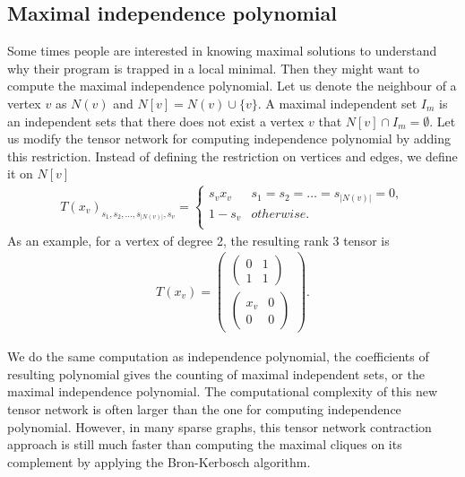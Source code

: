 \documentclass[review,onefignum,onetabnum]{siamart190516}
\newcommand{\<}{\langle}
\renewcommand{\>}{\rangle}
\newcounter{example}
\begin{document}
\subsection{Maximal independence polynomial}
Some times people are interested in knowing maximal solutions to understand why their program is trapped in a local minimal.
Then they might want to compute the maximal independence polynomial.
Let us denote the neighbour of a vertex $v$ as $N(v)$ and $N[v] = N(v)\cup \{v\}$.
A maximal independent set $I_m$ is an independent sets that there does not exist a vertex $v$ that $N[v] \cap I_m = \emptyset$.
Let us modify the tensor network for computing independence polynomial by adding this restriction.
Instead of defining the restriction on vertices and edges, we define it on $N[v]$
\begin{align}
    T(x_v)_{s_1,s_2,\ldots,s_{|N(v)|},s_v} = \begin{cases}
        s_vx_v & s_1=s_2=\ldots=s_{|N(v)|}=0,\\
        1-s_v& otherwise.\\
    \end{cases}
\end{align}
As an example, for a vertex of degree 2, the resulting rank 3 tensor is
\begin{align}
    T(x_v)=\left(\begin{matrix}
    \left(\begin{matrix}
        0 &1 \\
        1 &1
    \end{matrix}\right)\\
    \left(\begin{matrix}
        x_v &0 \\
        0 &0
    \end{matrix}\right)
    \end{matrix}\right).
\end{align}

We do the same computation as independence polynomial, the coefficients of resulting polynomial gives the counting of maximal independent sets, or the maximal independence polynomial.
The computational complexity of this new tensor network is often larger than the one for computing independence polynomial.
However, in many sparse graphs, this tensor network contraction approach is still much faster than computing the maximal cliques on its complement by applying the Bron-Kerbosch algorithm.
\end{document}
